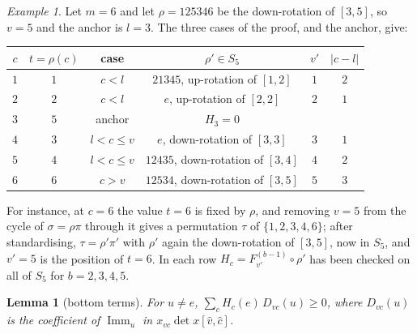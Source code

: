 \documentclass[11pt]{amsart}
\newtheorem{lemma}[theorem]{Lemma}
\theoremstyle{definition}
\theoremstyle{remark}
\newtheorem{exa}{Example}[section]
\newcommand{\Imm}{\operatorname{Imm}}
\begin{document}
\begin{exa}\label{exa:closure}
Let $m=6$ and let $\rho=125346$ be the down-rotation of $[3,5]$, so $v=5$ and the anchor is $l=3$. The three cases of the proof, and the anchor, give:
\begin{center}
\begin{tabular}{cccccc}
\toprule
$c$ & $t=\rho(c)$ & case & $\rho'\in S_5$ & $v'$ & $|c-l|$\\
\midrule
$1$ & $1$ & $c<l$ & $21345$, up-rotation of $[1,2]$ & $1$ & $2$\\
$2$ & $2$ & $c<l$ & $e$, up-rotation of $[2,2]$ & $2$ & $1$\\
$3$ & $5$ & anchor & $H_3=0$ & & \\
$4$ & $3$ & $l<c\le v$ & $e$, down-rotation of $[3,3]$ & $3$ & $1$\\
$5$ & $4$ & $l<c\le v$ & $12435$, down-rotation of $[3,4]$ & $4$ & $2$\\
$6$ & $6$ & $c>v$ & $12534$, down-rotation of $[3,5]$ & $5$ & $3$\\
\bottomrule
\end{tabular}
\end{center}
For instance, at $c=6$ the value $t=6$ is fixed by $\rho$, and removing $v=5$ from the cycle of $\sigma=\rho\pi$ through it gives a permutation $\tau$ of $\{1,2,3,4,6\}$; after standardising, $\tau=\rho'\pi'$ with $\rho'$ again the down-rotation of $[3,5]$, now in $S_5$, and $v'=5$ is the position of $t=6$. In each row $H_c=F^{(b-1)}_{v'}\circ\rho'$ has been checked on all of $S_5$ for $b=2,3,4,5$.
\end{exa}

\begin{lemma}[bottom terms]\label{lem:bottom}
For $u\ne e$, $\sum_cH_c(e)\,D_{vc}(u)\ge0$, where $D_{vc}(u)$ is the coefficient of $\Imm_u$ in $x_{vc}\det x[\hat v,\hat c]$.
\end{lemma}
\end{document}

